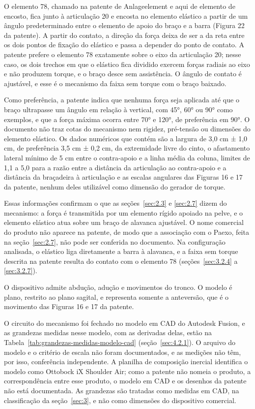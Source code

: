 O elemento 78, chamado na patente de Anlageelement e aqui de elemento de encosto, fica junto à articulação 20 e encosta no elemento elástico a partir de um ângulo predeterminado entre o elemento de apoio do braço e a barra (Figura 22 da patente). A partir do contato, a direção da força deixa de ser a da reta entre os dois pontos de fixação do elástico e passa a depender do ponto de contato. A patente prefere o elemento 78 exatamente sobre o eixo da articulação 20; nesse caso, os dois trechos em que o elástico fica dividido exercem forças radiais ao eixo e não produzem torque, e o braço desce sem assistência. O ângulo de contato é ajustável, e esse é o mecanismo da faixa sem torque com o braço baixado.

Como preferência, a patente indica que nenhuma força seja aplicada até que o braço ultrapasse um ângulo em relação à vertical, com 45°, 60° ou 90° como exemplos, e que a força máxima ocorra entre 70° e 120°, de preferência em 90°. O documento não traz cotas do mecanismo nem rigidez, pré-tensão ou dimensões do elemento elástico. Os dados numéricos que contém são a largura de 3,0 cm ± 1,0 cm, de preferência 3,5 cm ± 0,2 cm, da extremidade livre do cinto, o afastamento lateral mínimo de 5 cm entre o contra-apoio e a linha média da coluna, limites de 1,1 a 5,0 para a razão entre a distância da articulação ao contra-apoio e a distância da braçadeira à articulação e as escalas angulares das Figuras 16 e 17 da patente, nenhum deles utilizável como dimensão do gerador de torque.

Essas informações confirmam o que as seções~\ref{sec:2.3} e \ref{sec:2.7} dizem do mecanismo: a força é transmitida por um elemento rígido apoiado na pelve, e o elemento elástico atua sobre um braço de alavanca ajustável. O nome comercial do produto não aparece na patente, de modo que a associação com o Paexo, feita na seção~\ref{sec:2.7}, não pode ser conferida no documento. Na configuração analisada, o elástico liga diretamente a barra à alavanca, e a faixa sem torque descrita na patente resulta do contato com o elemento 78 (seções~\ref{sec:3.2.4} a \ref{sec:3.2.7}).

O dispositivo admite abdução, adução e movimentos do tronco. O modelo é plano, restrito ao plano sagital, e representa somente a anteversão, que é o movimento das Figuras 16 e 17 da patente.

O circuito do mecanismo foi fechado no modelo em CAD do Autodesk Fusion, e as grandezas medidas nesse modelo, com as derivadas delas, estão na Tabela~\ref{tab:grandezas-medidas-modelo-cad} (seção~\ref{sec:4.2.1}). O arquivo do modelo e o critério de escala não foram documentados, e as medições não têm, por isso, conferência independente. A planilha de composição inercial identifica o modelo como Ottobock iX Shoulder Air; como a patente não nomeia o produto, a correspondência entre esse produto, o modelo em CAD e os desenhos da patente não está documentada. As grandezas são tratadas como medidas em CAD, na classificação da seção~\ref{sec:3}, e não como dimensões do dispositivo comercial.


